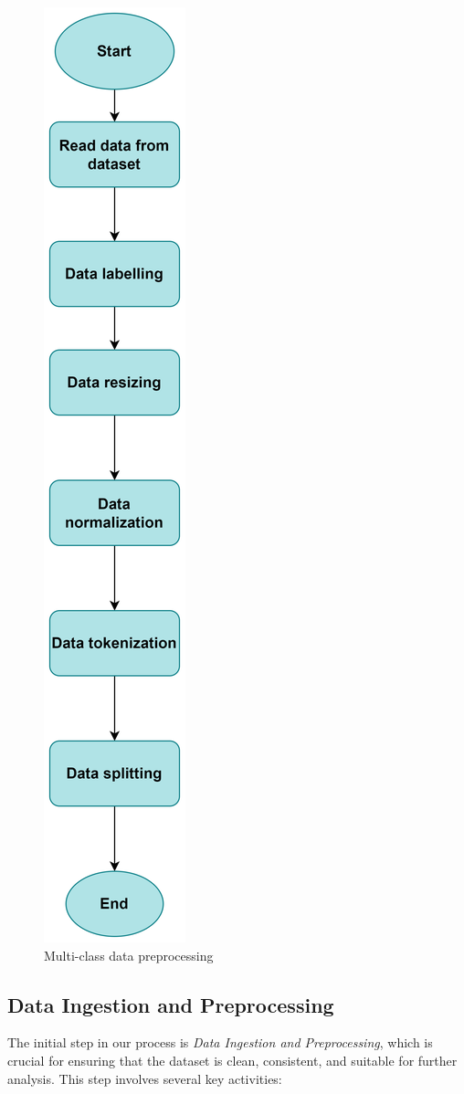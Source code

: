 \begin{figure}[ht]
    \centering
    \includegraphics[width=0.2\linewidth]{chap3/images/Datapreprocessing multiple.drawio.png}
    \caption{Multi-class data preprocessing }
    \label{fig:enteabel}
\end{figure}

\vfill
\clearpage









\subsection{Data Ingestion and Preprocessing}

The initial step in our process is \textit{Data Ingestion and Preprocessing}, which is crucial for ensuring that the dataset is clean, consistent, and suitable for further analysis. This step involves several key activities:

